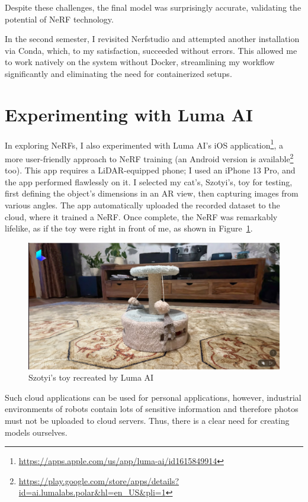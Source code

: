 Despite these challenges, the final model was surprisingly accurate, validating the potential of NeRF technology. 

In the second semester, I revisited Nerfstudio and attempted another installation via Conda, which, to my satisfaction, succeeded without errors. This allowed me to work natively on the system without Docker, streamlining my workflow significantly and eliminating the need for containerized setups.


\section{Experimenting with Luma AI}

In exploring NeRFs, I also experimented with Luma AI’s iOS application\footnote{\url{https://apps.apple.com/us/app/luma-ai/id1615849914}}, a more user-friendly approach to NeRF training (an Android version is available\footnote{\url{https://play.google.com/store/apps/details?id=ai.lumalabs.polar&hl=en_US&pli=1}} too). This app requires a LiDAR-equipped phone; I used an iPhone 13 Pro, and the app performed flawlessly on it. I selected my cat's, Szotyi’s, toy for testing, first defining the object’s dimensions in an AR view, then capturing images from various angles. The app automatically uploaded the recorded dataset to the cloud, where it trained a NeRF. Once complete, the NeRF was remarkably lifelike, as if the toy were right in front of me, as shown in Figure~\ref{fig:luma_ai_szotyi_toy}.

\begin{figure}[htbp]
	\centering
	\includegraphics[width=150mm, keepaspectratio]{figures_jpg/szotyi_jateka_luma_ai.jpg}
	\caption{Szotyi's toy recreated by Luma AI}
	\label{fig:luma_ai_szotyi_toy}
\end{figure}

Such cloud applications can be used for personal applications, however, industrial environments of robots contain lots of sensitive information and therefore photos must not be uploaded to cloud servers. Thus, there is a clear need for creating models ourselves.

